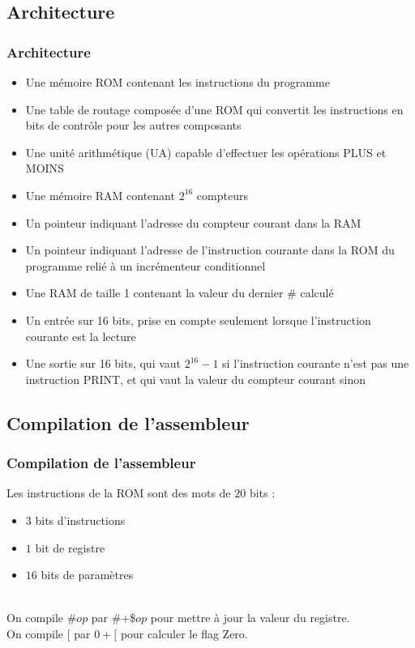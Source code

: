 \documentclass{beamer}
\begin{document}
	\subsection{Architecture}
	\begin{frame}
		\frametitle{Architecture}
        \begin{itemize}
            \item Une mémoire ROM contenant les instructions du programme
            \item Une table de routage composée d'une ROM qui convertit les instructions en bits de contrôle pour les autres composants
            \item Une unité arithmétique (UA) capable d'effectuer les opérations PLUS et MOINS
            \item Une mémoire RAM contenant $2^{16}$ compteurs
            \item Un pointeur indiquant l'adresse du compteur courant dans la RAM
            \item Un pointeur indiquant l'adresse de l'instruction courante dans la ROM du programme relié à un incrémenteur conditionnel
            \item Une RAM de taille 1 contenant la valeur du dernier \# calculé
            \item Un entrée sur 16 bits, prise en compte seulement lorsque l'instruction courante est la lecture
            \item Une sortie sur 16 bits, qui vaut $2^{16}-1$ si l'instruction courante n'est pas une instruction PRINT, et qui vaut la valeur du compteur courant sinon
        \end{itemize}
	\end{frame}

	\subsection{Compilation de l'assembleur}
	\begin{frame}
		\frametitle{Compilation de l'assembleur}
		Les instructions de la ROM sont des mots de $20$ bits :
		\pause
		\begin{itemize}
			\item $3$ bits d'instructions
			\pause
			\item $1$ bit de registre
			\pause
			\item $16$ bits de paramètres
		\end{itemize}
		\pause
		~\\
		On compile \#$op$ par \#$+$\$$op$ pour mettre à jour la valeur du
		registre.\pause \\
		On compile $[$ par $0+[$ pour calculer le flag Zero.
	\end{frame}
\end{document}
